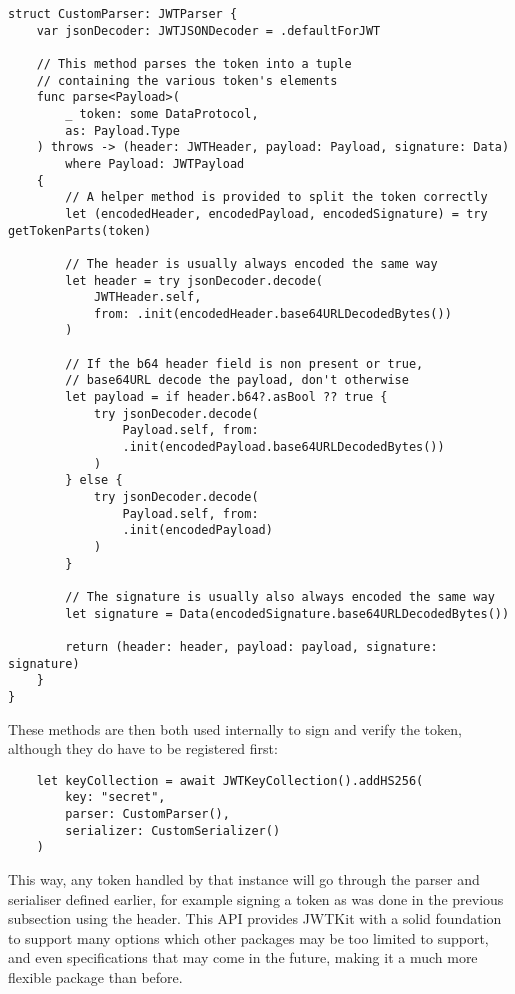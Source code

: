 \begin{verbatim}
struct CustomParser: JWTParser {
    var jsonDecoder: JWTJSONDecoder = .defaultForJWT

    // This method parses the token into a tuple 
    // containing the various token's elements
    func parse<Payload>(
        _ token: some DataProtocol, 
        as: Payload.Type
    ) throws -> (header: JWTHeader, payload: Payload, signature: Data) 
        where Payload: JWTPayload 
    {
        // A helper method is provided to split the token correctly
        let (encodedHeader, encodedPayload, encodedSignature) = try getTokenParts(token)

        // The header is usually always encoded the same way
        let header = try jsonDecoder.decode(
            JWTHeader.self, 
            from: .init(encodedHeader.base64URLDecodedBytes())
        )

        // If the b64 header field is non present or true, 
        // base64URL decode the payload, don't otherwise
        let payload = if header.b64?.asBool ?? true {
            try jsonDecoder.decode(
                Payload.self, from: 
                .init(encodedPayload.base64URLDecodedBytes())
            )
        } else {
            try jsonDecoder.decode(
                Payload.self, from: 
                .init(encodedPayload)
            )
        }

        // The signature is usually also always encoded the same way
        let signature = Data(encodedSignature.base64URLDecodedBytes())

        return (header: header, payload: payload, signature: signature)
    }
}
\end{verbatim}
These methods are then both used internally to sign and verify the token, although they do have to be registered first:
\begin{verbatim}
    let keyCollection = await JWTKeyCollection().addHS256(
        key: "secret", 
        parser: CustomParser(), 
        serializer: CustomSerializer()
    )
\end{verbatim}
This way, any token handled by that  instance will go through the parser and serialiser defined earlier, for example signing a token as was done in the previous subsection using the  header. This API provides JWTKit with a solid foundation to support many options which other packages may be too limited to support, and even specifications that may come in the future, making it a much more flexible package than before. \cite{jwtkit}

